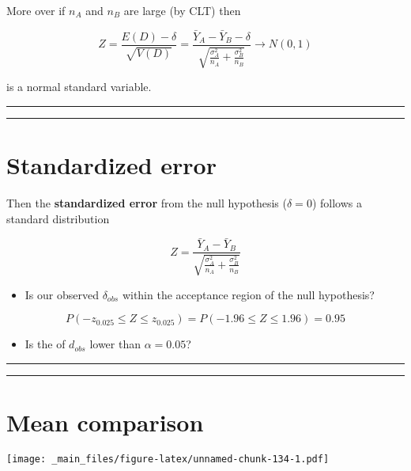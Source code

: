 \documentclass[
]{book}
\providecommand{\tightlist}{%
  \setlength{\itemsep}{0pt}\setlength{\parskip}{0pt}}
\begin{document}
More over if \(n_A\) and \(n_B\) are large (by CLT) then

\[Z=\frac{E(D)-\delta}{\sqrt{V(D)}}=\frac{\bar{Y}_A-\bar{Y}_B -\delta}{\sqrt{\frac{\sigma^2_A}{n_A}+\frac{\sigma^2_B}{n_B}}} \rightarrow N(0,1)\]

is a normal standard variable.

\begin{center}\rule{0.5\linewidth}{0.5pt}\end{center}

\begin{center}\rule{0.5\linewidth}{0.5pt}\end{center}

\hypertarget{standardized-error}{%
\section{Standardized error}\label{standardized-error}}

Then the \textbf{standardized error} from the null hypothesis (\(\delta=0\)) follows a standard distribution

\[Z=\frac{\bar{Y}_A-\bar{Y}_B}{\sqrt{\frac{\sigma^2_A}{n_A}+\frac{\sigma^2_B}{n_B}}}\]

\begin{itemize}
\tightlist
\item
  Is our observed \(\delta_{obs}\) within the acceptance region of the null hypothesis?
\end{itemize}

\[P(-z_{0.025} \leq Z \leq z_{0.025})=P(-1.96 \leq Z \leq 1.96)=0.95\]

\begin{itemize}
\tightlist
\item
  Is the of \(d_{obs}\) lower than \(\alpha=0.05\)?
\end{itemize}

\begin{center}\rule{0.5\linewidth}{0.5pt}\end{center}

\begin{center}\rule{0.5\linewidth}{0.5pt}\end{center}

\hypertarget{mean-comparison}{%
\section{Mean comparison}\label{mean-comparison}}

\texttt{[image: \_main\_files/figure-latex/unnamed-chunk-134-1.pdf]}
\end{document}
